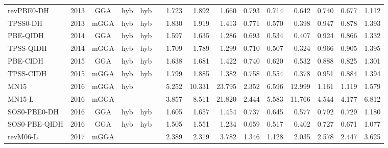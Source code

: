 \begin{landscape}
\begin{longtable}{lcccccrrrrrrrrr}
    revPBE0-DH       & 2013 & GGA  & hyb      & hyb         &           & 1.723             & 1.892             & 1.660  & 0.793              & 0.714             & 0.642  & 0.740   & 0.677 & 1.112 \\
    TPSS0-DH         & 2013 & mGGA & hyb      & hyb         &           & 1.830             & 1.919             & 1.413  & 0.771              & 0.570             & 0.398  & 0.947   & 0.878 & 1.393 \\
    PBE-QIDH         & 2014 & GGA  & hyb      & hyb         &           & 1.597             & 1.635             & 1.286  & 0.693              & 0.534             & 0.407  & 0.924   & 0.866 & 1.332 \\
    TPSS-QIDH        & 2014 & mGGA & hyb      & hyb         &           & 1.709             & 1.789             & 1.299  & 0.710              & 0.507             & 0.324  & 0.966   & 0.905 & 1.395 \\
    PBE-CIDH         & 2015 & GGA  & hyb      & hyb         &           & 1.638             & 1.681             & 1.422  & 0.740              & 0.620             & 0.532  & 0.888   & 0.825 & 1.301 \\
    TPSS-CIDH        & 2015 & mGGA & hyb      & hyb         &           & 1.799             & 1.885             & 1.382  & 0.758              & 0.554             & 0.378  & 0.951   & 0.884 & 1.394 \\
    MN15             & 2016 & mGGA & hyb      &             &           & 5.252             & 10.331            & 23.795 & 2.352              & 6.596             & 12.999 & 1.161   & 1.119 & 1.579 \\
    MN15-L           & 2016 & mGGA &          &             &           & 3.857             & 8.511             & 21.820 & 2.444              & 5.583             & 11.766 & 4.544   & 4.177 & 6.812 \\
    SOS0-PBE0-DH     & 2016 & GGA  & hyb      & hyb         &           & 1.605             & 1.657             & 1.454  & 0.737              & 0.645             & 0.577  & 0.792   & 0.729 & 1.180 \\
    SOS0-PBE-QIDH    & 2016 & GGA  & hyb      & hyb         &           & 1.505             & 1.551             & 1.234  & 0.659              & 0.517             & 0.402  & 0.727   & 0.671 & 1.077 \\
    revM06-L         & 2017 & mGGA &          &             &           & 2.389             & 2.319             & 3.782  & 1.346              & 1.128             & 2.035  & 2.578   & 2.447 & 3.625 \\

\end{longtable}
\end{landscape}

